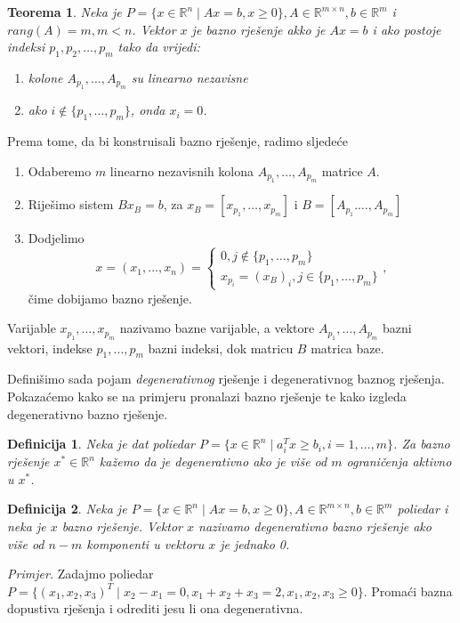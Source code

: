 \documentclass[a4paper, utf8, 11pt, colorlinks]{book}
\newtheorem{definition}{Definicija}
\newtheorem{thm}{Teorema}
\begin{document}
\begin{thm}
   Neka je $P = \{ x \in \mathbb{R}^n \mid A x = b, x \geq 0\}, A \in \mathbb{R}^{m \times n}, b \in \mathbb{R}^m$ i $rang(A)= m, m < n$.
   Vektor $x$ je bazno rješenje  akko je $A x = b$ i ako postoje indeksi $p_1,p_2,\ldots, p_m$ tako da vrijedi:
   \begin{enumerate}
       \item kolone $A_{p_1},\ldots, A_{p_m}$ su linearno nezavisne
       \item ako $i \notin \{p_1,\ldots, p_m\}$, onda $x_i = 0$.
   \end{enumerate}
   
\end{thm}
Prema tome, da bi  konstruisali bazno rješenje, radimo sljedeće
\begin{enumerate}
    \item Odaberemo $m$ linearno nezavisnih kolona $A_{p_1}, \ldots, A_{p_m}$ matrice $A$.
    \item Riješimo sistem $B x_B = b$, za $x_B = [x_{p_1}, \ldots, x_{p_m}]$ i $B= [A_{p_1}. \ldots, A_{p_m}]$
    \item Dodjelimo $$x = (x_1,\ldots, x_n)= \begin{cases}
    	          0, j  \not \in \{p_1,\ldots, p_m \} \\
    	         x_{p_i} = (x_B)_i, j \in \{ p_1,\ldots, p_m \}
    \end{cases},$$  čime dobijamo bazno rješenje. 
\end{enumerate}
Varijable $x_{p_1},\ldots, x_{p_m}$ nazivamo bazne varijable, a vektore  $A_{p_1}, \ldots, A_{p_m}$ bazni vektori, indekse $p_1,\ldots, p_m$ bazni indeksi, dok matricu $B$ matrica baze. 


Definišimo sada pojam \emph{degenerativnog} rješenje i degenerativnog baznog rješenja. Pokazaćemo kako se na primjeru pronalazi bazno rješenje te kako izgleda degenerativno bazno rješenje.

\begin{definition}
      Neka je dat poliedar $P = \{ x \in \mathbb{R}^n \mid a_i^T x \geq b_i, i=1,\ldots,m \}$. Za bazno rješenje $x^*\in \mathbb{R}^n$ kažemo da je degenerativno ako je više od $m$  ograničenja aktivno u $x^*$. 
      
\end{definition}

\begin{definition}
      Neka je $P = \{ x \in \mathbb{R}^n \mid A x = b, x \geq 0\}, A \in \mathbb{R}^{m \times n}, b \in \mathbb{R}^m$ poliedar   i neka je $x$ bazno rješenje. Vektor $x$ nazivamo degenerativno bazno rješenje ako više od $n-m$ komponenti u vektoru $x$ je jednako 0.
\end{definition}
\emph{Primjer.} Zadajmo poliedar $P= \{ (x_1,x_2,x_3)^T \mid x_2 - x_1 = 0, x_1 + x_2 +   x_3 = 2, x_1,x_2,x_3 \geq 0 \}$.  Promaći bazna dopustiva rješenja i odrediti jesu li ona degenerativna. \\
\end{document}
